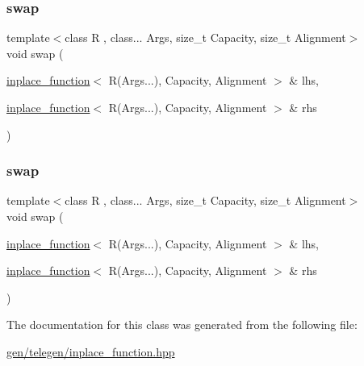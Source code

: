\mbox{\label{classstdext_1_1inplace__function_3_01R_07Args_8_8_8_08_00_01Capacity_00_01Alignment_01_4_ac652007694c3840de1d307fc57b972f5}} 
\subsubsection{\texorpdfstring{swap}{swap}\hspace{0.1cm}{\footnotesize\ttfamily [1/2]}}
{\footnotesize\ttfamily template$<$class R , class... Args, size\+\_\+t Capacity, size\+\_\+t Alignment$>$ \\
void swap (\begin{DoxyParamCaption}\item[{\hyperlink{classstdext_1_1inplace__function}{inplace\+\_\+function}$<$ R(Args...), Capacity, Alignment $>$ \&}]{lhs,  }\item[{\hyperlink{classstdext_1_1inplace__function}{inplace\+\_\+function}$<$ R(Args...), Capacity, Alignment $>$ \&}]{rhs }\end{DoxyParamCaption})\hspace{0.3cm}{\ttfamily [friend]}}

\mbox{\label{classstdext_1_1inplace__function_3_01R_07Args_8_8_8_08_00_01Capacity_00_01Alignment_01_4_ac652007694c3840de1d307fc57b972f5}} 
\subsubsection{\texorpdfstring{swap}{swap}\hspace{0.1cm}{\footnotesize\ttfamily [2/2]}}
{\footnotesize\ttfamily template$<$class R , class... Args, size\+\_\+t Capacity, size\+\_\+t Alignment$>$ \\
void swap (\begin{DoxyParamCaption}\item[{\hyperlink{classstdext_1_1inplace__function}{inplace\+\_\+function}$<$ R(Args...), Capacity, Alignment $>$ \&}]{lhs,  }\item[{\hyperlink{classstdext_1_1inplace__function}{inplace\+\_\+function}$<$ R(Args...), Capacity, Alignment $>$ \&}]{rhs }\end{DoxyParamCaption})\hspace{0.3cm}{\ttfamily [friend]}}



The documentation for this class was generated from the following file\+:\begin{DoxyCompactItemize}
\item 
\hyperlink{gen_2telegen_2inplace__function_8hpp}{gen/telegen/inplace\+\_\+function.\+hpp}\end{DoxyCompactItemize}
